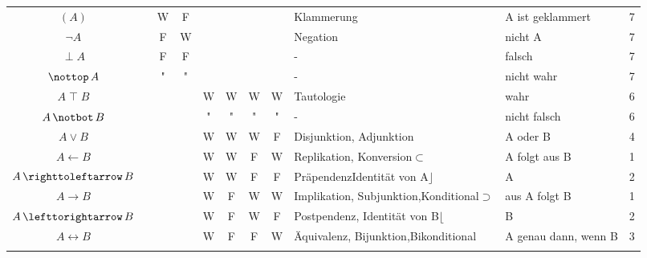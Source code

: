 \documentclass[english,ngerman,parskip=half,headsepline,footsepline]{scrreprt}
\newcommand{\lufalse}{\operatorname{\bot}}     %
\newcommand{\lnutrue}{\operatorname{\nottop}}  %
\newcommand{\lbtrue}{\operatorname{\top}}              %
\newcommand{\lnbfalse}{\operatorname{\notbot}}         %
\newcommand{\lleftimp}{\operatorname{\leftarrow}}      %
\newcommand{\lleft}{\operatorname{\righttoleftarrow}}  %
\newcommand{\limp}{\operatorname{\rightarrow}}         %
\newcommand{\lright}{\operatorname{\lefttorightarrow}} %
\newcommand{\lequiv}{\operatorname{\leftrightarrow}}   %
\begin{document}
\begin{table}
\begin{threeparttable}
\begin{tabularx}{\linewidth}{c||c:cc:cccc|X:X|c|}
			\tableline %
			$(A)$&&W&F&&&&&Klammerung&A ist geklammert&7\\
			\tableline %
			$\lnot A$&&F&W&&&&&Negation&nicht A&7\\
			\tableline %
			$\lufalse A$&&F&F&&&&&-&falsch&7\\
			\tableline %
			$\lnutrue A$&&"&"&&&&&-&nicht wahr&7\\
			\hline %
			$A\lbtrue B$&&&&W&W&W&W&Tautologie&wahr&6\\
			\tableline %
			$A\lnbfalse B$&&&&"&"&"&"&-&nicht falsch&6\\
			\tableline %
			$A\lor B$&&&&W&W&W&F&Disjunktion, Adjunktion&A oder B&4\\
			\tableline %
			$A\lleftimp B$&&&&W&W&F&W&Replikation, Konversion\newline$\subset$&A folgt aus B&1\\
			\tableline %
			$A\lleft B$&&&&W&W&F&F&Präpendenz\newline Identität von A\newline$\rfloor$&A&2\\
			\tablegroup %
			$A\limp B$&&&&W&F&W&W&Implikation, Subjunktion,\newline Konditional\newline$\supset$&aus A folgt B&1\\
			\tableline %
			$A\lright B$&&&&W&F&W&F&Postpendenz, Identität von B\newline$\lfloor$&B&2\\
			\tableline %
			$A\lequiv B$&&&&W&F&F&W&Äquivalenz, Bijunktion,\newline Bikonditional&A genau dann, wenn B&3\\
			\tableline %

\end{tabularx}
\end{threeparttable}
\end{table}
\end{document}

